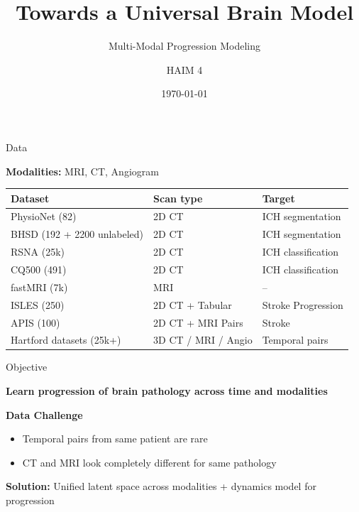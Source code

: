 \documentclass[aspectratio=169, t]{beamer}
\title{Towards a Universal Brain Model}
\subtitle{Multi-Modal Progression Modeling}
\author{HAIM 4}
\date{\today}
\begin{document}
\begin{frame}
  \titlepage
\end{frame}

\begin{frame}{Data}

  \textbf{Modalities:} MRI, CT, Angiogram

  \medskip

  \renewcommand{\arraystretch}{1.25}
  \begin{tabular}{@{}lll@{}}
    \textbf{Dataset} & \textbf{Scan type} & \textbf{Target} \\
    \hline
    PhysioNet (82) & 2D CT & ICH segmentation \\
    BHSD (192 + 2200 unlabeled) & 2D CT & ICH segmentation \\
    RSNA (25k) & 2D CT & ICH classification \\
    CQ500 (491) & 2D CT & ICH classification \\
    fastMRI (7k) & MRI & -- \\
    ISLES (250) & 2D CT + Tabular & Stroke Progression \\
    APIS (100) & 2D CT + MRI Pairs & Stroke \\
    Hartford datasets (25k+) & 3D CT / MRI / Angio & Temporal pairs \\
  \end{tabular}

\end{frame}

\begin{frame}{Objective}

  \textbf{\large Learn progression of brain pathology across time and modalities}

  \medskip

  \textbf{Data Challenge}
  \begin{itemize}
    \item Temporal pairs from same patient are rare
    \item CT and MRI look completely different for same pathology
  \end{itemize}

  \medskip

  \textbf{Solution:} Unified latent space across modalities + dynamics model for progression

\end{frame}
\end{document}
